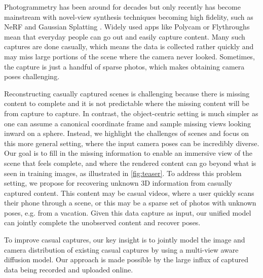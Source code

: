 Photogrammetry has been around for decades \cite{Sturm2011} but only recently has become mainstream with novel-view synthesis techniques becoming high fidelity, such as NeRF \cite{mildenhall2021nerf} and Gaussian Splatting \cite{kerbl20233d}.
Widely used apps like Polycam \cite{polycam} or Flythroughs \cite{Flythroughs} mean that everyday people can go out and easily capture content.
Many such captures are done casually, which means the data is collected rather quickly and may miss large portions of the scene where the camera never looked.
Sometimes, the capture is just a handful of sparse photos, which makes obtaining camera poses challenging.

Reconstructing casually captured scenes is challenging because there is missing content to complete and it is not predictable where the missing content will be from capture to capture.
In contrast, the object-centric setting is much simpler as one can assume a canonical coordinate frame and sample missing views looking inward on a sphere.
Instead, we highlight the challenges of scenes and focus on this more general setting, where the input camera poses can be incredibly diverse.
Our goal is to fill in the missing information to enable an immersive view of the scene that feels complete, and where the rendered content can go beyond what is seen in training images, as illustrated in \cref{fig:teaser}.
To address this problem setting, we propose \method for recovering unknown 3D information from casually captured content.
This content may be casual videos, where a user quickly scans their phone through a scene, or this may be a sparse set of photos with unknown poses, e.g. from a vacation.
Given this data capture as input, our unified model can jointly complete the unobserved content and recover poses.

To improve casual captures, our key insight is to jointly model the image and camera distribution of existing casual captures by using a multi-view aware diffusion model.
Our approach is made possible by the large influx of captured data being recorded and uploaded online.

